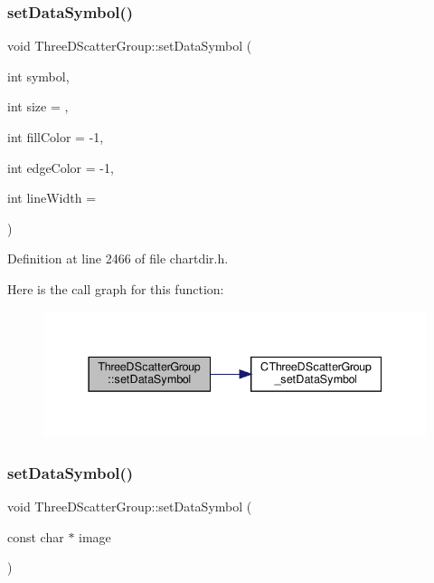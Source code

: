 \subsubsection{\texorpdfstring{set\+Data\+Symbol()}{setDataSymbol()}\hspace{0.1cm}{\footnotesize\ttfamily [1/4]}}
{\footnotesize\ttfamily void Three\+D\+Scatter\+Group\+::set\+Data\+Symbol (\begin{DoxyParamCaption}\item[{int}]{symbol,  }\item[{int}]{size = {},  }\item[{int}]{fill\+Color = {\ttfamily -\/1},  }\item[{int}]{edge\+Color = {\ttfamily -\/1},  }\item[{int}]{line\+Width = {} }\end{DoxyParamCaption})\hspace{0.3cm}{\ttfamily [inline]}}



Definition at line 2466 of file chartdir.\+h.

Here is the call graph for this function\+:
\nopagebreak
\begin{figure}[H]
\begin{center}
\leavevmode
\includegraphics[width=337pt]{class_three_d_scatter_group_ad4c071c469fa09c4c96f204f42c81a4b_cgraph}
\end{center}
\end{figure}
\mbox{\label{class_three_d_scatter_group_ab34e6305a2ee0a3b536d1e3144343dc4}} 
\subsubsection{\texorpdfstring{set\+Data\+Symbol()}{setDataSymbol()}\hspace{0.1cm}{\footnotesize\ttfamily [2/4]}}
{\footnotesize\ttfamily void Three\+D\+Scatter\+Group\+::set\+Data\+Symbol (\begin{DoxyParamCaption}\item[{const char $\ast$}]{image }\end{DoxyParamCaption})\hspace{0.3cm}{\ttfamily [inline]}}




